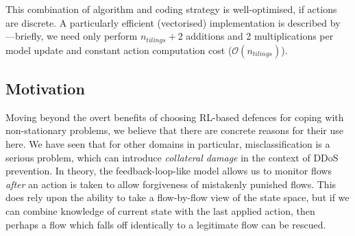 \documentclass[10pt, times, conference, letterpaper]{IEEEtran}
\begin{document}
This combination of algorithm and coding strategy is well-optimised, if actions are discrete.
A particularly efficient (vectorised) implementation is described by \textcite{RL2E}---briefly, we need only perform $n_{\mathit{tilings}} + 2$ additions and \num{2} multiplications per model update and constant action computation cost ($\mathcal{O}(n_{\mathit{tilings}})$).

\subsection{Motivation}\label{sec:motivation}
Moving beyond the overt benefits of choosing RL-based defences for coping with non-stationary problems, we believe that there are concrete reasons for their use here.
We have seen that for other domains in particular, misclassification is a serious problem, which can introduce \emph{collateral damage} in the context of DDoS prevention.
In theory, the feedback-loop-like model allows us to monitor flows \emph{after} an action is taken to allow forgiveness of mistakenly punished flows.
This does rely upon the ability to take a flow-by-flow view of the state space, but if we can combine knowledge of current state with the last applied action, then perhaps a flow which falls off identically to a legitimate flow can be rescued.
\end{document}
